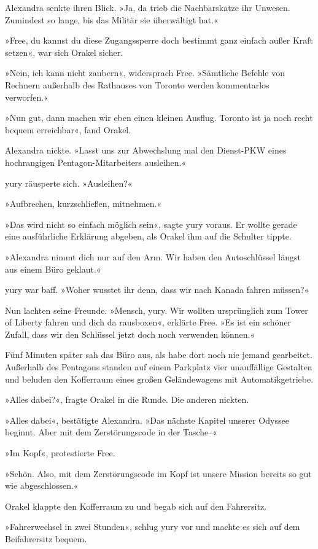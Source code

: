 Alexandra senkte ihren Blick. »Ja, da trieb die Nachbarskatze ihr Unwesen. Zumindest so lange, bis das Militär sie überwältigt hat.«

»Free, du kannst du diese Zugangssperre doch bestimmt ganz einfach außer Kraft setzen«, war sich Orakel sicher.

»Nein, ich kann nicht zaubern«, widersprach Free. »Sämtliche Befehle von Rechnern außerhalb des Rathauses von Toronto werden kommentarlos verworfen.«

»Nun gut, dann machen wir eben einen kleinen Ausflug. Toronto ist ja noch recht bequem erreichbar«, fand Orakel.

Alexandra nickte. »Lasst uns zur Abwechslung mal den Dienst-PKW eines hochrangigen Pentagon-Mitarbeiters ausleihen.«

yury räusperte sich. »Ausleihen?«

»Aufbrechen, kurzschließen, mitnehmen.«

»Das wird nicht so einfach möglich sein«, sagte yury voraus. Er wollte gerade eine ausführliche Erklärung abgeben, als Orakel ihm auf die Schulter tippte.

»Alexandra nimmt dich nur auf den Arm. Wir haben den Autoschlüssel längst aus einem Büro geklaut.«

yury war baff. »Woher wusstet ihr denn, dass wir nach Kanada fahren müssen?«

Nun lachten seine Freunde. »Mensch, yury. Wir wollten ursprünglich zum Tower of Liberty fahren und dich da rausboxen«, erklärte Free. »Es ist ein schöner Zufall, dass wir den Schlüssel jetzt doch noch verwenden können.«

Fünf Minuten später sah das Büro aus, als habe dort noch nie jemand gearbeitet. Außerhalb des Pentagons standen auf einem Parkplatz vier unauffällige Gestalten und beluden den Kofferraum eines großen Geländewagens mit Automatikgetriebe.

»Alles dabei?«, fragte Orakel in die Runde. Die anderen nickten.

»Alles dabei«, bestätigte Alexandra. »Das nächste Kapitel unserer Odyssee beginnt. Aber mit dem Zerstörungscode in der Tasche–«

»Im Kopf«, protestierte Free.

»Schön. Also, mit dem Zerstörungscode im Kopf ist unsere Mission bereits so gut wie abgeschlossen.«

Orakel klappte den Kofferraum zu und begab sich auf den Fahrersitz.

»Fahrerwechsel in zwei Stunden«, schlug yury vor und machte es sich auf dem Beifahrersitz bequem.

